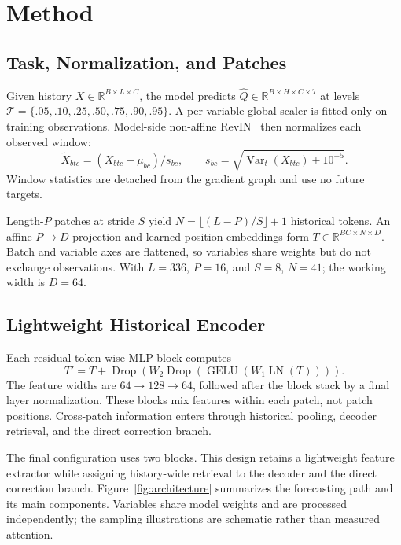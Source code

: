 \section{Method}
\label{sec:method}

\subsection{Task, Normalization, and Patches}
Given history $X\in\mathbb R^{B\times L\times C}$, the model predicts
$\widehat Q\in\mathbb R^{B\times H\times C\times7}$ at levels
$\mathcal T=\{.05,.10,.25,.50,.75,.90,.95\}$.
A per-variable global scaler is fitted only on training observations. Model-side non-affine RevIN~\cite{kim2022revin} then normalizes each observed window:
\begin{equation}
 \widetilde X_{btc}=(X_{btc}-\mu_{bc})/s_{bc},\qquad
 s_{bc}=\sqrt{\operatorname{Var}_t(X_{btc})+10^{-5}}.
\end{equation}
Window statistics are detached from the gradient graph and use no future targets.

Length-$P$ patches at stride $S$ yield
$N=\lfloor(L-P)/S\rfloor+1$ historical tokens. An affine $P\rightarrow D$ projection and learned position embeddings form $T\in\mathbb R^{BC\times N\times D}$. Batch and variable axes are flattened, so variables share weights but do not exchange observations. With $L=336$, $P=16$, and $S=8$, $N=41$; the working width is $D=64$.

\subsection{Lightweight Historical Encoder}
Each residual token-wise MLP block computes
\begin{equation}
 T'=T+\operatorname{Drop}\!\left(W_2
 \operatorname{Drop}(\operatorname{GELU}(W_1\operatorname{LN}(T)))\right).
\end{equation}
The feature widths are $64\rightarrow128\rightarrow64$, followed after the block stack by a final layer normalization. These blocks mix features within each patch, not patch positions. Cross-patch information enters through historical pooling, decoder retrieval, and the direct correction branch.

The final configuration uses two blocks. This design retains a lightweight feature extractor while assigning history-wide retrieval to the decoder and the direct correction branch. Figure~\ref{fig:architecture} summarizes the forecasting path and its main components. Variables share model weights and are processed independently; the sampling illustrations are schematic rather than measured attention.

